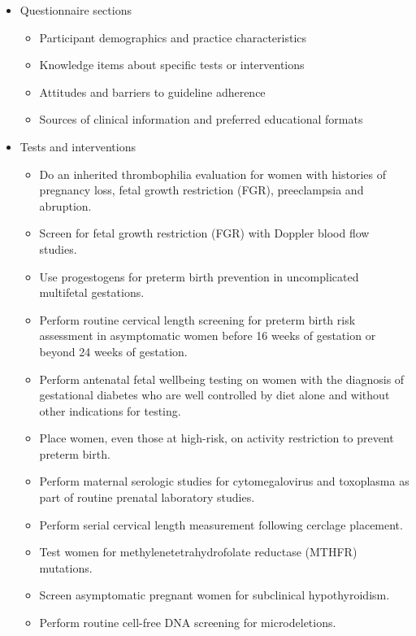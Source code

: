 \documentclass[
  letterpaper,
  DIV=11,
  numbers=noendperiod]{scrartcl}
\begin{document}
\begin{itemize}
\item
  Questionnaire sections

  \begin{itemize}
  \item
    Participant demographics and practice characteristics
  \item
    Knowledge items about specific tests or interventions
  \item
    Attitudes and barriers to guideline adherence
  \item
    Sources of clinical information and preferred educational formats
  \end{itemize}
\item
  Tests and interventions

  \begin{itemize}
  \item
    Do an inherited thrombophilia evaluation for women with histories of
    pregnancy loss, fetal growth restriction (FGR), preeclampsia and
    abruption.
  \item
    Screen for fetal growth restriction (FGR) with Doppler blood flow
    studies.
  \item
    Use progestogens for preterm birth prevention in uncomplicated
    multifetal gestations.
  \item
    Perform routine cervical length screening for preterm birth risk
    assessment in asymptomatic women before 16 weeks of gestation or
    beyond 24 weeks of gestation.
  \item
    Perform antenatal fetal wellbeing testing on women with the
    diagnosis of gestational diabetes who are well controlled by diet
    alone and without other indications for testing.
  \item
    Place women, even those at high-risk, on activity restriction to
    prevent preterm birth.
  \item
    Perform maternal serologic studies for cytomegalovirus and
    toxoplasma as part of routine prenatal laboratory studies.
  \item
    Perform serial cervical length measurement following cerclage
    placement.
  \item
    Test women for methylenetetrahydrofolate reductase (MTHFR)
    mutations.
  \item
    Screen asymptomatic pregnant women for subclinical hypothyroidism.
  \item
    Perform routine cell-free DNA screening for microdeletions.

\end{itemize}
\end{itemize}
\end{document}
